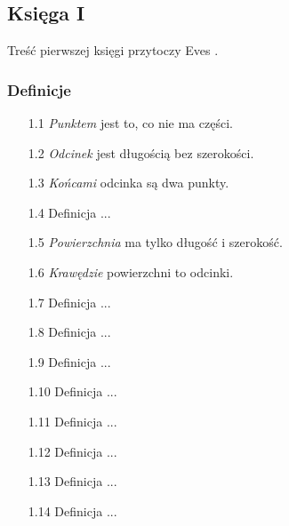 \subsection{Księga I}	
Treść pierwszej księgi przytoczy Eves \cite[s. 375-379]{eves1_1972}.

\subsubsection{Definicje}	
\begin{enumerate}	
    \item [1.1] \emph{Punktem} jest to, co nie ma części.
    \item [1.2] \emph{Odcinek} jest długością bez szerokości.
    \item [1.3] \emph{Końcami} odcinka są dwa punkty.
    \item [1.4] Definicja ... %
    \item [1.5] \emph{Powierzchnia} ma tylko długość i szerokość.
    \item [1.6] \emph{Krawędzie} powierzchni to odcinki.
    \item [1.7] Definicja ... %
    \item [1.8] Definicja ... %
    \item [1.9] Definicja ... %
    \item [1.10] Definicja ... %
    \item [1.11] Definicja ... %
    \item [1.12] Definicja ... %
    \item [1.13] Definicja ... %
    \item [1.14] Definicja ... %

\end{enumerate}
